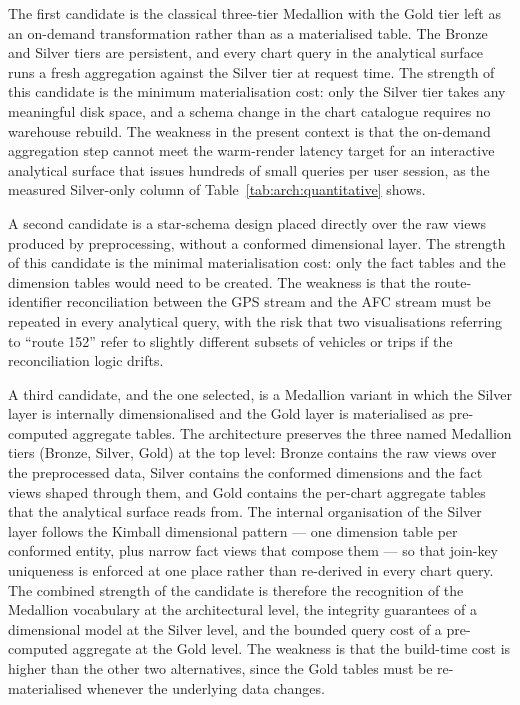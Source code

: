 The first candidate is the classical three-tier Medallion with the
Gold tier left as an on-demand transformation rather than as a
materialised table. The Bronze and Silver tiers are persistent, and
every chart query in the analytical surface runs a fresh aggregation
against the Silver tier at request time. The strength of this
candidate is the minimum materialisation cost: only the Silver tier
takes any meaningful disk space, and a schema change in the chart
catalogue requires no warehouse rebuild. The weakness in the present
context is that the on-demand aggregation step cannot meet the
warm-render latency target for an interactive analytical surface
that issues hundreds of small queries per user session, as the
measured Silver-only column of Table~\ref{tab:arch:quantitative}
shows.

A second candidate is a star-schema design placed directly over the raw
views produced by preprocessing, without a conformed dimensional layer. The
strength of this candidate is the minimal materialisation cost: only the
fact tables and the dimension tables would need to be created. The weakness
is that the route-identifier reconciliation between the GPS stream and the
AFC stream must be repeated in every analytical query, with the risk that
two visualisations referring to ``route 152'' refer to slightly different
subsets of vehicles or trips if the reconciliation logic drifts.

A third candidate, and the one selected, is a Medallion variant
\cite{databricksMedallion} in which the Silver layer is internally
dimensionalised and the Gold layer is materialised as pre-computed
aggregate tables. The architecture preserves the three named
Medallion tiers (Bronze, Silver, Gold) at the top level: Bronze
contains the raw views over the preprocessed data, Silver contains
the conformed dimensions and the fact views shaped through them, and
Gold contains the per-chart aggregate tables that the analytical
surface reads from. The internal organisation of the Silver layer
follows the Kimball dimensional pattern --- one dimension table per
conformed entity, plus narrow fact views that compose them --- so
that join-key uniqueness is enforced at one place rather than
re-derived in every chart query. The combined strength of the
candidate is therefore the recognition of the Medallion vocabulary at
the architectural level, the integrity guarantees of a dimensional
model at the Silver level, and the bounded query cost of a
pre-computed aggregate at the Gold level. The weakness is that the
build-time cost is higher than the other two alternatives, since the
Gold tables must be re-materialised whenever the underlying data
changes.

